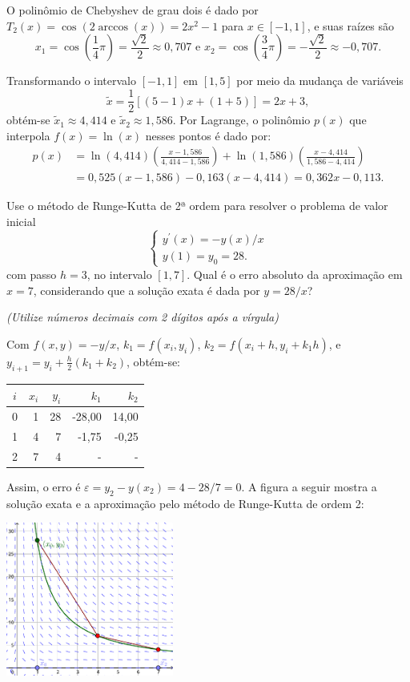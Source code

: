 \documentclass[12pt,a4paper]{article}
\begin{document}
\begin{ExerciseList}
\Answer O polinômio de Chebyshev de grau dois é dado por $T_2(x) = \cos(2\arccos(x)) = 2 x^2 - 1$ para $x \in [-1, 1]$, e suas raízes são
\[
x_1 = \cos\left(\frac{1}{4}\pi\right) = \frac{\sqrt{2}}{2} \approx 0,707
\text{ e }
x_2 = \cos\left(\frac{3}{4}\pi\right) = -\frac{\sqrt{2}}{2} \approx -0,707.
\]

Transformando o intervalo $[-1, 1]$ em $[1, 5]$ por meio da mudança de variáveis
\[
\tilde{x} = \frac{1}{2}[(5-1)x + (1+5)] = 2x + 3,
\]
obtém-se $\tilde{x}_1 \approx 4,414$ e $\tilde{x}_2 \approx 1,586$. Por Lagrange, o polinômio $p(x)$ que interpola $f(x) = \ln(x)$ nesses pontos é dado por:
\begin{align*}
p(x)
& = \ln(4,414) \left(\frac{x - 1,586}{4,414 - 1,586}\right)
+ \ln(1,586) \left(\frac{x - 4,414}{1,586 - 4,414}\right)\\
& = 0,525 (x - 1,586) - 0,163 (x - 4,414)
  = 0,362 x - 0,113.
\end{align*}

\Exercise[title={2,0}] Use o método de Runge-Kutta de 2ª ordem para resolver o problema de valor inicial
\[
\begin{cases}
y^\prime(x) = -y(x)/x \\
y(1) = y_0 = 28.
\end{cases}
\]
com passo $h=3$, no intervalo $[1, 7]$. Qual é o erro absoluto da aproximação em $x=7$, considerando que a solução exata é dada por $y = 28/x$?

{\color{blue} \textit{(Utilize números decimais com 2 dígitos após a vírgula)}}

\Answer
Com $f(x,y) = -y/x$,
$k_1 = f(x_i, y_i)$,
$k_2 = f(x_i + h, y_i + k_1 h)$, e
$y_{i+1} = y_i + \frac{h}{2} (k_1 + k_2)$, obtém-se:
\medskip
\begin{center}
    \begin{tabular}{crrrr}
    \hline
       $i$ & $x_i$  & $y_i$ & $k_1$ & $k_2$ \\
    \hline
    0 & 1 & 28 & -28,00 & 14,00 \\
    1 & 4 &  7 &  -1,75 & -0,25 \\
    2 & 7 &  4 &  - & - \\
    \hline
    \end{tabular}
\end{center}
\medskip
Assim, o erro é $\varepsilon = y_2 - y(x_2) = 4 - 28/7 = 0$. A figura a seguir mostra a solução exata e a aproximação pelo método de Runge-Kutta de ordem 2:
\medskip
\begin{center}
\includegraphics[width=5.5cm]{img/prova-3-cci-runge-kutta-2.pdf}
\end{center}
\end{ExerciseList}
\end{document}
